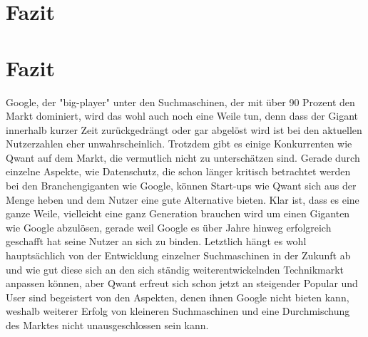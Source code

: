\documentclass[11pt]{article}
\begin{document}
\chapter{Fazit}\label{ch:fazit}

    \chapter{Fazit}\label{ch:fazit2}

    Google, der "big-player" unter den Suchmaschinen, der mit über 90 Prozent den Markt dominiert,
    wird das wohl auch noch eine Weile tun, denn dass der Gigant innerhalb kurzer Zeit zurückgedrängt oder gar abgelöst wird ist bei den aktuellen Nutzerzahlen eher unwahrscheinlich.
    Trotzdem gibt es einige Konkurrenten wie Qwant auf dem Markt, die vermutlich nicht zu unterschätzen sind.
    Gerade durch einzelne Aspekte, wie Datenschutz, die schon länger kritisch betrachtet werden bei den Branchengiganten wie Google,
    können Start-ups wie Qwant sich aus der Menge heben und dem Nutzer eine gute Alternative bieten.
    Klar ist, dass es eine ganze Weile, vielleicht eine ganz Generation brauchen wird um einen Giganten wie Google abzulösen,
    gerade weil Google es über Jahre hinweg erfolgreich geschafft hat seine Nutzer an sich zu binden.
    Letztlich hängt es wohl hauptsächlich von der Entwicklung einzelner Suchmaschinen in der Zukunft ab und wie gut diese sich an den sich ständig weiterentwickelnden Technikmarkt anpassen können,
    aber Qwant erfreut sich schon jetzt an steigender Popular und User sind begeistert von den Aspekten, denen ihnen Google nicht bieten kann,
    weshalb weiterer Erfolg von kleineren Suchmaschinen und eine Durchmischung des Marktes nicht unausgeschlossen sein kann.
\end{document}
